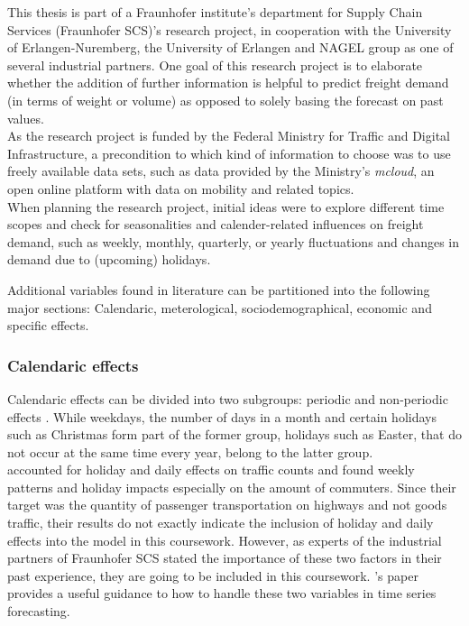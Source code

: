 \documentclass[a4paper, 11pt]{article}
\begin{document}
This thesis is part of a Fraunhofer institute's department for Supply Chain Services (Fraunhofer SCS)'s research project, in cooperation with the University of Erlangen-Nuremberg, the University of Erlangen and NAGEL group as one of several industrial partners. 
One goal of this research project is to elaborate whether the addition of further information is helpful to predict freight demand (in terms of weight or volume) as opposed to solely basing the forecast on past values.\\
As the research project is funded by the Federal Ministry for Traffic and Digital Infrastructure, a precondition to which kind of information to choose was to use freely available data sets, such as data provided by the Ministry's \textit{mcloud}, an open online platform with data on mobility and related topics. \\
When planning the research project, initial ideas were to explore different time scopes and check for seasonalities and calender-related influences on freight demand, such as weekly, monthly, quarterly, or yearly fluctuations and changes in demand due to (upcoming) holidays. \

Additional variables found in literature can be partitioned into the following major sections: Calendaric, meterological, sociodemographical, economic and specific effects.




\subsubsection{Calendaric effects}

Calendaric effects can be divided into two subgroups: periodic and non-periodic effects \citep{Godfrey.2000}. While weekdays, the number of days in a month and certain holidays such as Christmas form part of the former group, holidays such as Easter, that do not occur at the same time every year, belong to the latter group.\\ 
\cite{Cools.2009} accounted for holiday and daily effects on traffic counts and found weekly patterns and holiday impacts especially on the amount of commuters. Since their target was the quantity of passenger transportation on highways and not goods traffic, their results do not exactly indicate the inclusion of holiday and daily effects into the model in this coursework. However, as experts of the industrial partners of Fraunhofer SCS stated the importance of these two factors in their past experience, they are going to be included in this coursework. \cite{Cools.2009}'s paper provides a useful guidance to how to handle these two variables in time series forecasting.\
\end{document}
